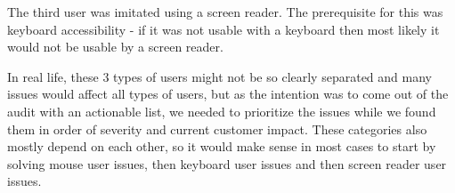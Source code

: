 \documentclass{master_thesis}
\begin{document}
The third user was imitated using a screen reader. The prerequisite for this was keyboard accessibility - if it was not usable with a keyboard then most likely it would not be usable by a screen reader.

In real life, these 3 types of users might not be so clearly separated and many issues would affect all types of users, but as the intention was to come out of the audit with an actionable list, we needed to prioritize the issues while we found them in order of severity and current customer impact. These categories also mostly depend on each other, so it would make sense in most cases to start by solving mouse user issues, then keyboard user issues and then screen reader user issues.
\end{document}
